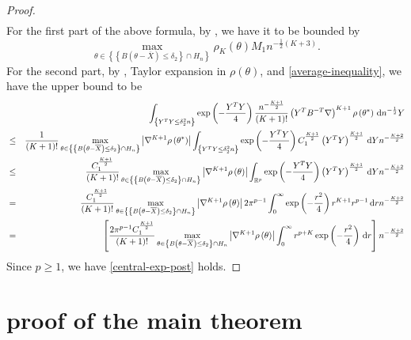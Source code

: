 \begin{proof}
\begin{eqnarray*}
\end{eqnarray*}
For the first part of the above formula, by ,
we have it to be bounded by 
\[
\max_{\theta\in\left\{ \left\{ B\left(\theta-\overline{X}\right)\le\delta_{2}\right\} \cap H_{n}\right\} }\rho_{K}\left(\theta\right)M_{1}n^{-\frac{1}{2}\left(K+3\right)}.
\]
For the second part, by , Taylor
expansion in $\rho\left(\theta\right)$, and \eqref{average-inequality},
we have the upper bound to be 
\begin{eqnarray*}
 &  & \int_{\left\{ Y^{T}Y\le\delta_{2}^{2}n\right\} }\exp\left(-\frac{Y^{T}Y}{4}\right)\frac{n^{-\frac{K+1}{2}}}{\left(K+1\right)!}\left(Y^{T}B^{-T}\nabla\right)^{K+1}\rho\left(\theta^{*}\right)\,\mathrm{d} n^{-\frac{1}{2}}Y\\
 & \le & \frac{1}{\left(K+1\right)!}\max_{\theta\in\left\{ \left\{ B\left(\theta-\overline{X}\right)\le\delta_{2}\right\} \cap H_{n}\right\} }\left|\nabla^{K+1}\rho\left(\theta^{*}\right)\right|\int_{\left\{ Y^{T}Y\le\delta_{2}^{2}n\right\} }\exp\left(-\frac{Y^{T}Y}{4}\right)C_{1}^{\frac{K+1}{2}}\left(Y^{T}Y\right)^{\frac{K+1}{2}}\,\mathrm{d} Yn^{-\frac{K+2}{2}}\\
 & \le & \frac{C_{1}^{\frac{K+1}{2}}}{\left(K+1\right)!}\max_{\theta\in\left\{ \left\{ B\left(\theta-\overline{X}\right)\le\delta_{2}\right\} \cap H_{n}\right\} }\left|\nabla^{K+1}\rho\left(\theta\right)\right|\int_{\mathbb{R}^{p}}\exp\left(-\frac{Y^{T}Y}{4}\right)\left(Y^{T}Y\right)^{\frac{K+1}{2}}\,\mathrm{d} Yn^{-\frac{K+2}{2}}\\
 & = & \frac{C_{1}^{\frac{K+1}{2}}}{\left(K+1\right)!}\max_{\theta\in\left\{ \left\{ B\left(\theta-\overline{X}\right)\le\delta_{2}\right\} \cap H_{n}\right\} }\left|\nabla^{K+1}\rho\left(\theta\right)\right|2\pi^{p-1}\int_{0}^{\infty}\exp\left(-\frac{r^{2}}{4}\right)r^{K+1}r^{p-1}\,\mathrm{d} rn^{-\frac{K+2}{2}}\\
 & = & \left[\frac{2\pi^{p-1}C_{1}^{\frac{K+1}{2}}}{\left(K+1\right)!}\max_{\theta\in\left\{ B\left(\theta-\overline{X}\right)\le\delta_{2}\right\} \cap H_{n}}\left|\nabla^{K+1}\rho\left(\theta\right)\right|\int_{0}^{\infty}r^{p+K}\exp\left(-\frac{r^{2}}{4}\right)\,\mathrm{d} r\right]n^{-\frac{K+2}{2}}
\end{eqnarray*}
Since $p\ge1$, we have \eqref{central-exp-post} holds.
\end{proof}

\section{proof of the main theorem}

